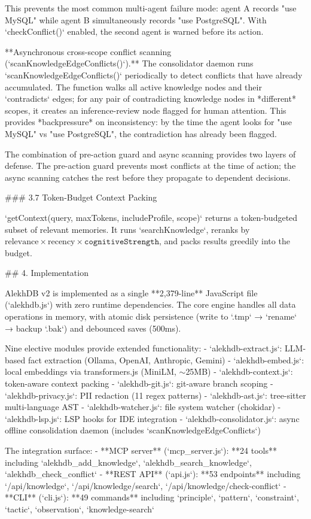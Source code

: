 This prevents the most common multi-agent failure mode: agent A records "use MySQL" while agent B simultaneously records "use PostgreSQL". With `checkConflict()` enabled, the second agent is warned before its action.

**Asynchronous cross-scope conflict scanning (`scanKnowledgeEdgeConflicts()`).** The consolidator daemon runs `scanKnowledgeEdgeConflicts()` periodically to detect conflicts that have already accumulated. The function walks all active knowledge nodes and their `contradicts` edges; for any pair of contradicting knowledge nodes in *different* scopes, it creates an inference-review node flagged for human attention. This provides *backpressure* on inconsistency: by the time the agent looks for "use MySQL" vs "use PostgreSQL", the contradiction has already been flagged.

The combination of pre-action guard and async scanning provides two layers of defense. The pre-action guard prevents most conflicts at the time of action; the async scanning catches the rest before they propagate to dependent decisions.

### 3.7 Token-Budget Context Packing

`getContext({query, maxTokens, includeProfile, scope})` returns a token-budgeted subset of relevant memories. It runs `searchKnowledge`, reranks by $\text{relevance} \times \text{recency} \times \texttt{cognitiveStrength}$, and packs results greedily into the budget.

## 4. Implementation

AlekhDB v2 is implemented as a single **2,379-line** JavaScript file (`alekhdb.js`) with zero runtime dependencies. The core engine handles all data operations in memory, with atomic disk persistence (write to `.tmp` → `rename` → backup `.bak`) and debounced saves (500ms).

Nine elective modules provide extended functionality:
- `alekhdb-extract.js`: LLM-based fact extraction (Ollama, OpenAI, Anthropic, Gemini)
- `alekhdb-embed.js`: local embeddings via transformers.js (MiniLM, $\sim$25MB)
- `alekhdb-context.js`: token-aware context packing
- `alekhdb-git.js`: git-aware branch scoping
- `alekhdb-privacy.js`: PII redaction (11 regex patterns)
- `alekhdb-ast.js`: tree-sitter multi-language AST
- `alekhdb-watcher.js`: file system watcher (chokidar)
- `alekhdb-lsp.js`: LSP hooks for IDE integration
- `alekhdb-consolidator.js`: async offline consolidation daemon (includes `scanKnowledgeEdgeConflicts`)

The integration surface:
- **MCP server** (`mcp_server.js`): **24 tools** including `alekhdb_add_knowledge`, `alekhdb_search_knowledge`, `alekhdb_check_conflict`
- **REST API** (`api.js`): **53 endpoints** including `/api/knowledge`, `/api/knowledge/search`, `/api/knowledge/check-conflict`
- **CLI** (`cli.js`): **49 commands** including `principle`, `pattern`, `constraint`, `tactic`, `observation`, `knowledge-search`

